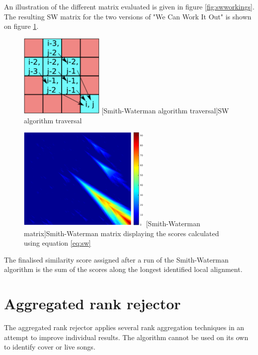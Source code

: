 An illustration of the different matrix evaluated is given in figure
\ref{fig:swworkings}. The resulting SW matrix for the two versions of "We Can
Work It Out" is shown on figure \ref{fig:swmatrix}.
\begin{figure}[H]
    \centering
    \begin{minipage}{.5\textwidth}
      \centering
      \includegraphics[height=4cm, keepaspectratio]{Algorithms/swworkings.png}
      [Smith-Waterman algorithm traversal]{SW algorithm traversal}
      \label{fig:swworkings}
    \end{minipage}%
    \begin{minipage}{.5\textwidth}
      \centering
      \includegraphics[height=5cm, keepaspectratio]{Algorithms/swmatrix.png}
      [Smith-Waterman matrix]{Smith-Waterman matrix displaying the scores calculated using equation \ref{eq:sw}}
      \label{fig:swmatrix}
    \end{minipage}
 \end{figure}

The finalised similarity score assigned after a run of the Smith-Waterman
algorithm is the sum of the scores along the longest identified local alignment.

\section{Aggregated rank rejector} 
\label{sec:rankaggregation}

The aggregated rank rejector applies several rank aggregation techniques in an
attempt to improve individual results. The algorithm cannot be used on its own
to identify cover or live songs.

